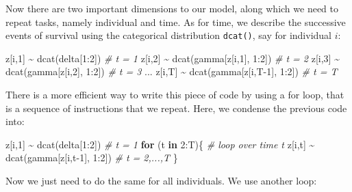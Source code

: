 \documentclass[
  12pt,
]{krantz}
\newenvironment{Shaded}{\begin{snugshade}}{\end{snugshade}}
\newcommand{\CommentTok}[1]{\textcolor[rgb]{0.56,0.35,0.01}{\textit{#1}}}
\newcommand{\ControlFlowTok}[1]{\textcolor[rgb]{0.13,0.29,0.53}{\textbf{#1}}}
\newcommand{\DecValTok}[1]{\textcolor[rgb]{0.00,0.00,0.81}{#1}}
\newcommand{\FunctionTok}[1]{\textcolor[rgb]{0.00,0.00,0.00}{#1}}
\newcommand{\NormalTok}[1]{#1}
\newcommand{\SpecialCharTok}[1]{\textcolor[rgb]{0.00,0.00,0.00}{#1}}
\begin{document}
Now there are two important dimensions to our model, along which we need to repeat tasks, namely individual and time. As for time, we describe the successive events of survival using the categorical distribution \texttt{dcat()}, say for individual \(i\):

\begin{Shaded}
\begin{Highlighting}[]
\NormalTok{z[i,}\DecValTok{1}\NormalTok{] }\SpecialCharTok{\textasciitilde{}} \FunctionTok{dcat}\NormalTok{(delta[}\DecValTok{1}\SpecialCharTok{:}\DecValTok{2}\NormalTok{])           }\CommentTok{\# t = 1}
\NormalTok{z[i,}\DecValTok{2}\NormalTok{] }\SpecialCharTok{\textasciitilde{}} \FunctionTok{dcat}\NormalTok{(gamma[z[i,}\DecValTok{1}\NormalTok{], }\DecValTok{1}\SpecialCharTok{:}\DecValTok{2}\NormalTok{])   }\CommentTok{\# t = 2}
\NormalTok{z[i,}\DecValTok{3}\NormalTok{] }\SpecialCharTok{\textasciitilde{}} \FunctionTok{dcat}\NormalTok{(gamma[z[i,}\DecValTok{2}\NormalTok{], }\DecValTok{1}\SpecialCharTok{:}\DecValTok{2}\NormalTok{])   }\CommentTok{\# t = 3}
\NormalTok{...}
\NormalTok{z[i,T] }\SpecialCharTok{\textasciitilde{}} \FunctionTok{dcat}\NormalTok{(gamma[z[i,T}\DecValTok{{-}1}\NormalTok{], }\DecValTok{1}\SpecialCharTok{:}\DecValTok{2}\NormalTok{]) }\CommentTok{\# t = T}
\end{Highlighting}
\end{Shaded}

There is a more efficient way to write this piece of code by using a for loop, that is a sequence of instructions that we repeat. Here, we condense the previous code into:

\begin{Shaded}
\begin{Highlighting}[]
\NormalTok{z[i,}\DecValTok{1}\NormalTok{] }\SpecialCharTok{\textasciitilde{}} \FunctionTok{dcat}\NormalTok{(delta[}\DecValTok{1}\SpecialCharTok{:}\DecValTok{2}\NormalTok{])             }\CommentTok{\# t = 1}
\ControlFlowTok{for}\NormalTok{ (t }\ControlFlowTok{in} \DecValTok{2}\SpecialCharTok{:}\NormalTok{T)\{ }\CommentTok{\# loop over time t}
\NormalTok{  z[i,t] }\SpecialCharTok{\textasciitilde{}} \FunctionTok{dcat}\NormalTok{(gamma[z[i,t}\DecValTok{{-}1}\NormalTok{], }\DecValTok{1}\SpecialCharTok{:}\DecValTok{2}\NormalTok{]) }\CommentTok{\# t = 2,...,T}
\NormalTok{\}}
\end{Highlighting}
\end{Shaded}

Now we just need to do the same for all individuals. We use another loop:
\end{document}

